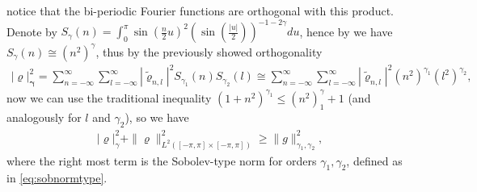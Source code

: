 \documentclass{article}
\begin{document}
notice that the bi-periodic Fourier functions are orthogonal with this product. Denote by $S_\gamma(n) =\int_{0}^{\pi} \sin(\frac{n}{2} u) ^2
\left(\sin\left(\frac{|u|}{2}\right)\right)^{-1-2\gamma}du $, hence by \cite[(8.8)]{kress2013linear} we have $S_\gamma(n) \cong (n^2)^\gamma$, thus by the previously showed orthogonality  
\begin{align}
\label{eq:smnormeq}
|\varrho |_{\mathbf{\gamma}}^2 = \sum_{n=-\infty}^\infty \sum_{l=-\infty}^{\infty} |\widetilde{\varrho}_{n,l}|^2 S_{\gamma_1}(n) S_{\gamma_2}(l) \cong \sum_{n=-\infty}^\infty \sum_{l=-\infty}^{\infty} |\widetilde{\varrho}_{n,l}|^2 (n^2)^{\gamma_1} (l^2)^{\gamma_2},
\end{align}
 now we can use the traditional inequality  $(1+n^2)^{\gamma_1}  \leq (n^2)^\gamma_1 +1$ (and analogously for $l$ and $\gamma_2$), so we have 
 \begin{align*}
 |\varrho|^2_{\gamma} + \| \varrho\|^2_{L^2([-\pi,\pi]\times [-\pi,\pi])} \geq  \|g\|_{\gamma_1,\gamma_2}^2,
 \end{align*}
 where the right most term is the Sobolev-type norm for orders $\gamma_1,\gamma_2$, defined as in \eqref{eq:sobnormtype}.
\end{document}
